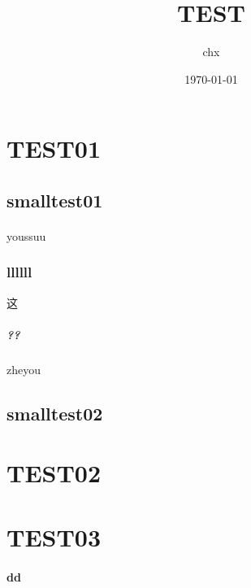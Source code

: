 \documentclass[UTF8,a4paper]{ctexart}
\author{chx}
\date{\today}
\title{TEST}
\begin{document}
    \maketitle
    \tableofcontents
    \newpage
    \section{TEST01}
        \subsection{smalltest01}
            \paragraph{}youssuu
                \subsubsection{llllll}这

            \subparagraph{??}zheyou

        \subsection{smalltest02}



    \section{TEST02}
    \section{TEST03}


    \paragraph{dd}
\end{document}
